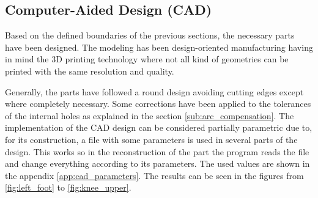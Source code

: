 \subsection{Computer-Aided Design (CAD)} %
\label{sub:computer_aided_design}
Based on the defined boundaries of the previous sections, the necessary parts have been designed.
The modeling has been design-oriented manufacturing having in mind the 3D printing technology where not all kind of geometries can be printed with the same resolution and quality.

Generally, the parts have followed a round design avoiding cutting edges except where completely necessary.
Some corrections have been applied to the tolerances of the internal holes as explained in the section \ref{sub:arc_compensation}.
The implementation of the CAD design can be considered partially parametric due to, for its construction, a file with some parameters is used in several parts of the design.
This works so in the reconstruction of the part the program reads the file and change everything according to its parameters.
The used values are shown in the appendix \ref{app:cad_parameters}.
The results can be seen in the figures from \ref{fig:left_foot} to \ref{fig:knee_upper}.

